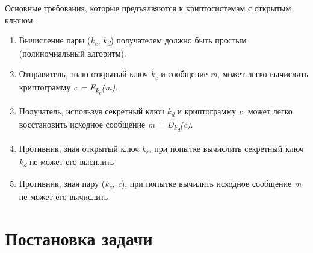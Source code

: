 Основные требования, которые предъялвяются к криптосистемам с открытым ключом:
\begin{enumerate}
	\item Вычисление пары (\textit{k\textsubscript{e}}, \textit{k\textsubscript{d}}) получателем должно быть простым (полиномиальный алгоритм).
	\item Отправитель, знаю открытый ключ \textit{k\textsubscript{e}} и сообщение \textit{m}, может легко вычислить криптограмму \textit{c = E\textsubscript{k\textsubscript{e}}(m)}.
	\item Получатель, используя секретный ключ \textit{k\textsubscript{d}} и криптограмму \textit{c}, может легко восстановить исходное сообщение \textit{m = D\textsubscript{k\textsubscript{d}}(c)}.
	\item Противник, зная открытый ключ \textit{k\textsubscript{e}}, при попытке вычислить секретный ключ \textit{k\textsubscript{d}} не может его высилить
	\item Противник, зная пару (\textit{k\textsubscript{e}, c}), при попытке вычилить исходное сообщение \textit{m} не может его вычислить
\end{enumerate}

\section{Постановка задачи}